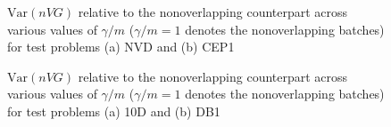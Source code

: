 \documentclass[12pt]{article}
\newcommand{\var}[1]{\mathrm{Var} \left( #1 \right)}
\begin{document}
\begin{figure}[htb!]
	\centering
	\caption{
		$\var{n VG}$ relative to the nonoverlapping counterpart across various values of $\gamma/m$ ($\gamma/m=1$ denotes the nonoverlapping batches) for test problems
		(a) NVD and
		(b) CEP1
	}
\label{fig:varvar1}
\end{figure}

\begin{figure}[htb!]
	\centering
		\caption{
		$\var{n VG}$ relative to the nonoverlapping counterpart across various values of $\gamma/m$ ($\gamma/m=1$ denotes the nonoverlapping batches) for test problems
		(a) 10D and
		(b) DB1
		}
\label{fig:varvar2}
\end{figure}
\end{document}
